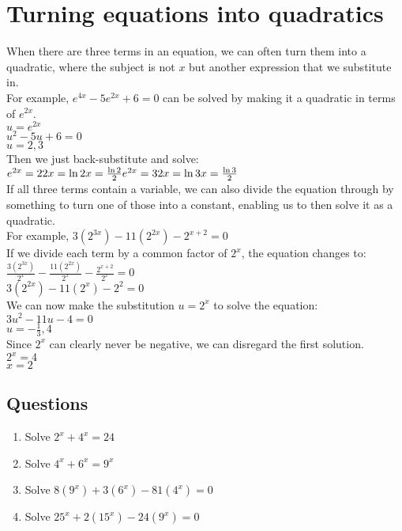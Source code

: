\documentclass[../main.tex]{subfiles}
\begin{document}
\section{Turning equations into quadratics}
When there are three terms in an equation, we can often turn them into a quadratic, where the subject is not \(x\) but another expression that we substitute in.\\
For example, \(e^{4x}-5e^{2x}+6=0\) can be solved by making it a quadratic in terms of \(e^{2x}\).\\

\(u=e^{2x}\)\\
\(u^2-5u+6=0\)\\
\(u=2, 3\)\\
Then we just back-substitute and solve:\\
\(
e^{2x}=2     \\      
2x=\ln{2}      \\ 
x=\frac{\ln{2}}{2}\\     
e^{2x}=3\\
2x=\ln{3}\\
x=\frac{\ln{3}}{2}
\)\\

If all three terms contain a variable, we can also divide the equation through by something to turn one of those into a constant, enabling us to then solve it as a quadratic.\\
For example, \(3(2^{3x})-11(2^{2x})-2^{x+2}=0\)\\
If we divide each term by a common factor of \(2^x\), the equation changes to:\\

\(\frac{3(2^{3x})}{2^x}-\frac{11(2^{2x})}{2^x}-\frac{2^{x+2}}{2^x}=0\)\\

\(3(2^{2x})-11(2^x)-2^2=0\)\\

We can now make the substitution \(u=2^x\) to solve the equation:\\

\(3u^2-11u-4=0\)\\
\(u=-\frac{1}{3}, 4\)\\

Since \(2^x\) can clearly never be negative, we can disregard the first solution.\\
\(2^x=4\)\\
\(x=2\)\\

\pagebreak

\subsection*{Questions}
\label{quadratics}
\begin{enumerate}
    \item Solve \(2^x+4^x=24\)
    \item Solve \(4^x+6^x=9^x\)
    \item Solve \(8(9^x)+3(6^x)-81(4^x)=0\)
    \item Solve \(25^x+2(15^x)-24(9^x)=0\)
\end{enumerate}
\end{document}
